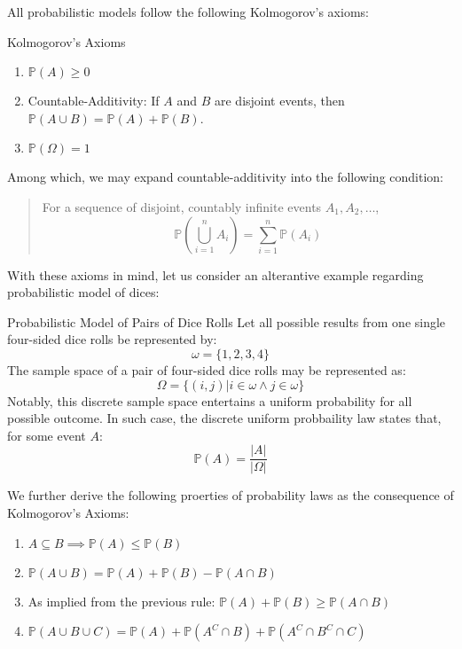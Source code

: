 All probabilistic models follow the following Kolmogorov's axioms:
\begin{ln-theorem}{Kolmogorov's Axioms}{}
    \begin{enumerate}
        \item $\mathbb{P}(A) \geq 0$
        \item Countable-Additivity: If $A$ and $B$ are disjoint events, then $\mathbb{P}(A \cup B) = \mathbb{P}(A) + \mathbb{P}(B)$.
        \item $\mathbb{P}(\Omega) = 1$
    \end{enumerate}
    Among which, we may expand countable-additivity into the following condition:
    \begin{quote}
        For a sequence of disjoint, countably infinite events $A_1, A_2, \dots$,
        \[
            \mathbb{P} (\bigcup_{i=1}^n A_i) = \sum_{i=1}^n \mathbb{P}(A_i)
        \]
    \end{quote}
\end{ln-theorem}

With these axioms in mind, let us consider an alterantive example regarding probabilistic model of dices:
\begin{ln-example}{Probabilistic Model of Pairs of Dice Rolls}{}
    Let all possible results from one single four-sided dice rolls be represented by:
    \[
        \omega = \{1, 2, 3, 4\}
    \]
    The sample space of a pair of four-sided dice rolls may be represented as:
    \[
        \Omega = \{ (i, j) | i \in \omega \land j \in \omega\}
    \]
    Notably, this discrete sample space entertains a uniform probability for all possible outcome. In such case, the discrete uniform probbaility law states that, for some event $A$:
    \[
        \mathbb{P}(A) = \frac{|A|}{|\Omega|}
    \]
\end{ln-example}

We further derive the following proerties of probability laws as the consequence of Kolmogorov's Axioms:
\begin{enumerate}
    \item $A \subseteq B \implies \mathbb{P}(A) \leq \mathbb{P}(B)$
    \item $\mathbb{P}(A \cup B) = \mathbb{P}(A) + \mathbb{P}(B) - \mathbb{P}(A \cap B)$
    \item As implied from the previous rule: $\mathbb{P}(A) + \mathbb{P}(B) \geq \mathbb{P}(A \cap B)$
    \item $\mathbb{P}(A \cup B \cup C) = \mathbb{P}(A) + \mathbb{P}(A^C \cap B) + \mathbb{P}(A^C \cap B^C \cap C)$
\end{enumerate}

